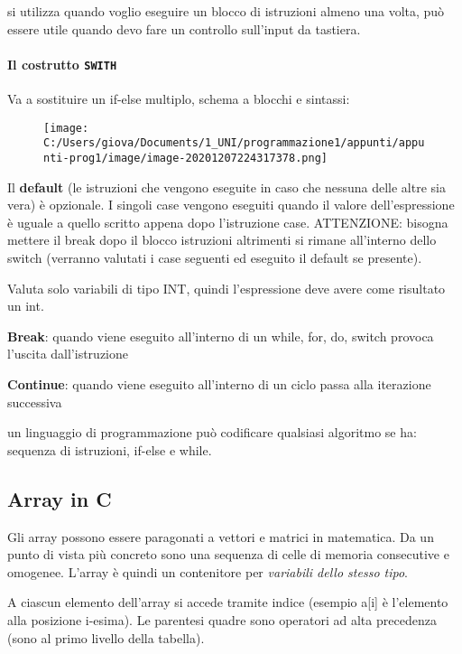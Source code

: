\documentclass[
]{article}
\begin{document}
si utilizza quando voglio eseguire un blocco di istruzioni almeno una
volta, può essere utile quando devo fare un controllo sull'input da
tastiera.

\hypertarget{header-n419}{%
\paragraph{\texorpdfstring{Il costrutto
\texttt{SWITH}}{Il costrutto SWITH}}\label{header-n419}}

Va a sostituire un if-else multiplo, schema a blocchi e sintassi:

\begin{figure}
\centering
\texttt{[image: C:/Users/giova/Documents/1\_UNI/programmazione1/appunti/appunti-prog1/image/image-20201207224317378.png]}
\caption{}
\end{figure}

Il \textbf{default} (le istruzioni che vengono eseguite in caso che
nessuna delle altre sia vera) è opzionale. I singoli case vengono
eseguiti quando il valore dell'espressione è uguale a quello scritto
appena dopo l'istruzione case. ATTENZIONE: bisogna mettere il break dopo
il blocco istruzioni altrimenti si rimane all'interno dello switch
(verranno valutati i case seguenti ed eseguito il default se presente).

Valuta solo variabili di tipo INT, quindi l'espressione deve avere come
risultato un int.

\textbf{Break}: quando viene eseguito all'interno di un while, for, do,
switch provoca l'uscita dall'istruzione

\textbf{Continue}: quando viene eseguito all'interno di un ciclo passa
alla iterazione successiva

un linguaggio di programmazione può codificare qualsiasi algoritmo se
ha: sequenza di istruzioni, if-else e while.

\hypertarget{header-n427}{%
\subsection{Array in C}\label{header-n427}}

Gli array possono essere paragonati a vettori e matrici in matematica.
Da un punto di vista più concreto sono una sequenza di celle di memoria
consecutive e omogenee. L'array è quindi un contenitore per
\emph{variabili dello stesso tipo}.

A ciascun elemento dell'array si accede tramite indice (esempio a{[}i{]}
è l'elemento alla posizione i-esima). Le parentesi quadre sono operatori
ad alta precedenza (sono al primo livello della tabella).
\end{document}
